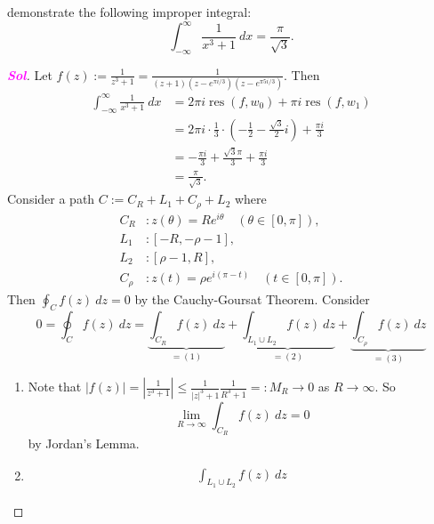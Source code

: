\documentclass{article}
\theoremstyle{definition}
\newcommand{\of}[1]{\left( #1 \right)}
\newcommand{\abs}[1]{\left\lvert #1 \right\rvert}
\newcommand{\sol}{\textcolor{magenta}{\bf Sol}}
\newcommand{\res}{\operatorname{res}}
\begin{document}
\begin{enumerate}[\bf 1.]
\begin{enumerate}
\begin{center}
		\end{center}
		demonstrate the following improper integral:\[
		\int_{-\infty}^{\infty}\frac{1}{x^3+1}\ dx=\frac{\pi}{\sqrt{3}}.
		\]
		\begin{proof}[\sol]
			Let $\displaystyle f(z):=\frac{1}{z^3+1}=\frac{1}{(z+1)(z-e^{\pi i/3})(z-e^{\pi 5i/3})}$. Then
			\begin{align*}
				\int_{-\infty}^{\infty}\frac{1}{x^3+1}\ dx&=2\pi i\res(f,w_0)+\pi i\res(f,w_1)\\
				&=2\pi i\cdot\frac{1}{3}\cdot\of{-\frac{1}{2}-\frac{\sqrt{3}}{2}i}+\frac{\pi i}{3}\\
				&=-\frac{\pi i}{3}+\frac{\sqrt{3}\pi}{3}+\frac{\pi i}{3}\\
				&=\frac{\pi}{\sqrt{3}}.
			\end{align*}
			Consider a path $C:=C_R+L_1+C_\rho+L_2$ where \begin{align*}
				C_R&: z(\theta)=Re^{i\theta}\quad(\theta\in[0,\pi]),\\
				L_1&: [-R,-\rho-1],\\
				L_2&: [\rho-1,R],\\
				C_\rho&: z(t)=\rho e^{i(\pi-t)}\quad(t\in[0,\pi]).
			\end{align*} Then $\oint_C f(z)\ dz=0$ by the Cauchy-Goursat Theorem. Consider \[
			0=\oint_C f(z)\ dz=\underbrace{\int_{C_R}f(z)\ dz}_{=(1)}+\underbrace{\int_{L_1\cup L_2}f(z)\ dz}_{=(2)}+\underbrace{\int_{C_\rho}f(z)\ dz}_{=(3)}
			\] \begin{enumerate}[(1)]
				\item Note that $\abs{f(z)}=\abs{\frac{1}{z^3+1}}\leq\frac{1}{\abs{z}^3+1}\frac{1}{R^3+1}=:M_R\to 0$ as $R\to\infty$. So \[
				\lim\limits_{R\to\infty}\int_{C_R}f(z)\ dz=0
				\] by Jordan's Lemma.
				\item \begin{align*}
					\int_{L_1\cup L_2}f(z)\ dz

\end{align*}
\end{enumerate}
\end{proof}
\end{enumerate}
\end{enumerate}
\end{document}
